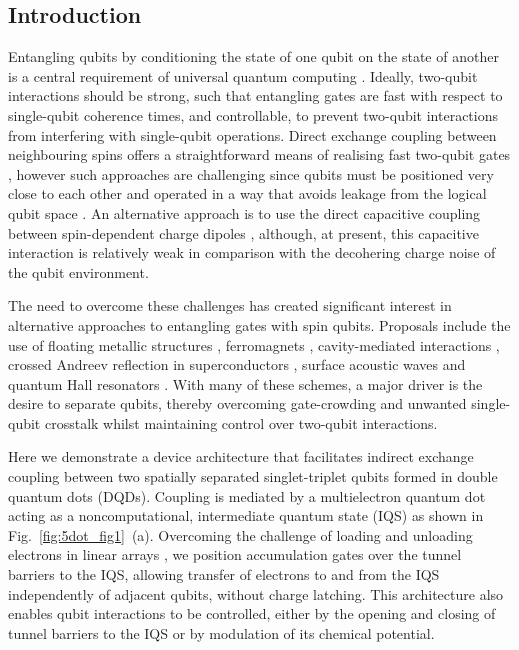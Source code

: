 \subsection{Introduction}
Entangling qubits by conditioning the state of one qubit on the state of another is a central requirement of universal quantum computing \cite{divcrit1, divincenzo_crit}. Ideally, two-qubit interactions should be strong, such that entangling gates are fast with respect to single-qubit coherence times, and controllable, to prevent two-qubit interactions from interfering with single-qubit operations.  Direct exchange coupling between neighbouring spins offers a straightforward means of realising fast two-qubit gates \cite{burkard,petta,nature15263,controlexchange}, however such approaches are challenging since qubits must be positioned very close to each other \cite{PhysRevLett.114.226803} and operated in a way that avoids leakage from the logical qubit space \cite{wardrop,leakage}. An alternative approach is to use the direct capacitive coupling between spin-dependent charge dipoles \cite{Shulman202,PhysRevLett.107.030506,nphys174}, although, at present, this capacitive interaction is relatively weak in comparison with the decohering charge noise of the qubit environment.

The need to overcome these challenges has created significant interest in alternative approaches to entangling gates with spin qubits. Proposals include the use of floating metallic structures \cite{floatinggate}, ferromagnets \cite{ferromagnet}, cavity-mediated interactions \cite{QED,nature11559,dispersivewallraff}, crossed Andreev reflection in superconductors \cite{andreev}, surface acoustic waves \cite{SAWtheory,SAWexp,SAWexp2}  and quantum Hall resonators \cite{quantumhall, dohertyqhe}. With many of these schemes, a major driver is the desire to separate qubits, thereby overcoming gate-crowding and unwanted single-qubit crosstalk whilst maintaining control over two-qubit interactions.

Here we demonstrate a device architecture that facilitates indirect exchange coupling between two spatially separated singlet-triplet qubits formed in double quantum dots (DQDs). Coupling is mediated by a multielectron quantum dot acting as a noncomputational, intermediate quantum state (IQS) \cite{Malinowski, jelena1, bluhm, PhysRevLett.114.226803} as shown in Fig.~\ref{fig:5dot_fig1}~(a). Overcoming the challenge of loading and unloading electrons in linear arrays \cite{srep39113}, we position accumulation gates over the tunnel barriers to the IQS, allowing transfer of electrons to and from the IQS independently of adjacent qubits, without charge latching. This architecture also enables qubit interactions to be controlled, either by the opening and closing of tunnel barriers to the IQS or by modulation of its chemical potential.

